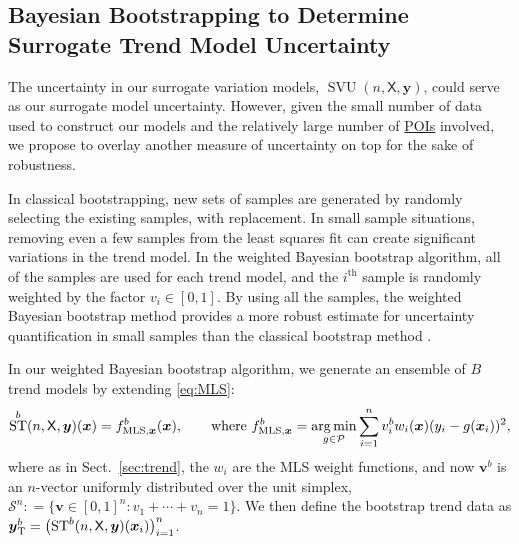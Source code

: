 \documentclass[11pt]{NSFamsart}
\newcommand{\POIs}{\hyperlink{POIlink}{POIs}\xspace}
\DeclareMathOperator*{\argmin}{arg\,min}
\DeclareMathOperator{\STREND}{ST} %
\DeclareMathOperator{\SVARERR}{SVU} %
\newcommand{\TREND}{\textup{T}}
\newcommand{\LS}{\textup{MLS}}
\newcommand{\mX}{\mathsf{X}}
\newcommand{\bx}{{\boldsymbol{x}}}
\newcommand{\bv}{{\boldsymbol{v}}}
\newcommand{\by}{{\boldsymbol{y}}}
\newcommand{\calp}{{\mathcal{P}}}
\newcommand{\cals}{{\mathcal{S}}}
\begin{document}
\subsection{Bayesian Bootstrapping to Determine Surrogate Trend Model Uncertainty} \label{sec:BayesianBootUncertainty}
The uncertainty in our surrogate variation models, $\SVARERR(n,\mX,\by)$, could serve as our surrogate model uncertainty. However, given the small number of data used to construct our models and the relatively large number of \POIs involved, we propose to overlay another measure of uncertainty on top for the sake of robustness. 

In classical bootstrapping, new sets of samples are generated by randomly selecting the existing samples, with replacement. 
In small sample situations, removing even a few samples from the least squares fit can create significant variations in the trend model. In the weighted Bayesian bootstrap algorithm, all of the samples are used for each trend model, and the $i^{\text{th}}$ sample is randomly weighted by the factor $v_i \in [0,1]$. By using all the samples, the weighted Bayesian bootstrap method provides a more robust estimate for uncertainty quantification in small samples than the classical bootstrap method \cite{rubin1981bayesian, efron1986bootstrap, efron2016computer}. 

In our weighted Bayesian bootstrap algorithm, we generate an ensemble of $B$ trend models by extending \eqref{eq:MLS}:
\begin{equation}
	\STREND^b(n,\mX,\by)(\bx) = f^b_{\LS,\bx}(\bx), \qquad \text{where } f^b_{\LS,\bx} = \argmin_{g \in \calp} \sum_{i=1}^n v_i^b w_i(\bx)(y_i - g(\bx_i))^2,
\end{equation}
where as in Sect.\ \ref{sec:trend}, the $w_i$ are the MLS weight functions, and now $\bv^b$ is an $n$-vector uniformly distributed over the unit simplex, $\cals^n : = \{\bv \in [0,1]^n : v_1 + \cdots + v_n = 1\}$. We then define the bootstrap trend data as $\by^b_{\TREND} = \bigl(\STREND^b(n,\mX,\by)(\bx_i) \bigr)_{i=1}^n$. 
\end{document}
